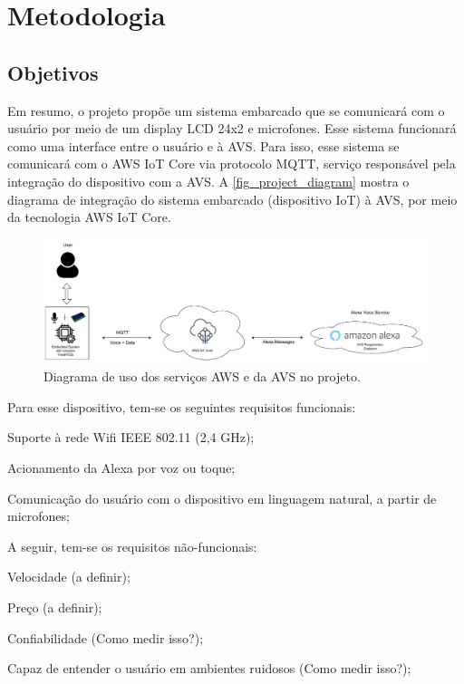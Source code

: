 \chapter{Metodologia}

\section{Objetivos}

Em resumo, o projeto propõe um sistema embarcado que se comunicará com o usuário por meio de um display LCD 24x2 e microfones. Esse sistema funcionará como uma interface entre o usuário e à AVS. Para isso, esse sistema se comunicará com o AWS IoT Core via protocolo MQTT, serviço responsável pela integração do dispositivo com a AVS. A \autoref{fig_project_diagram} mostra o diagrama de integração do sistema embarcado (dispositivo IoT) à AVS, por meio da tecnologia AWS IoT Core.

\begin{figure}[htb]
	\begin{center}
		\caption{Diagrama de uso dos serviços AWS e da AVS no projeto.}
		\includegraphics[scale=0.4]{Imagens/project_diagram.pdf}
	\end{center}
	\label{fig_project_diagram}
\end{figure}

Para esse dispositivo, tem-se os seguintes requisitos funcionais:
\begin{alineas}
	\item Suporte à rede Wifi IEEE 802.11 (2,4 GHz);
	\item Acionamento da Alexa por voz ou toque;
	\item Comunicação do usuário com o dispositivo em linguagem natural, a partir de microfones;
\end{alineas}

A seguir, tem-se os requisitos não-funcionais:
\begin{alineas}
	\item Velocidade (a definir);
	\item Preço (a definir);
	\item Confiabilidade (Como medir isso?);
	\item Capaz de entender o usuário em ambientes ruidosos (Como medir isso?);
\end{alineas}

